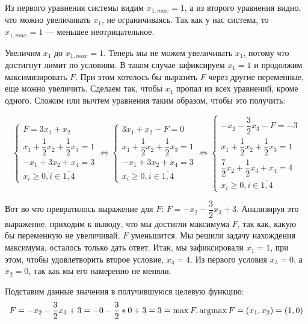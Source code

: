 Из первого уравнения системы видим $x_{1, max} = 1$, а из второго уравнения видно, что можно увеличивать $x_1$, не ограничиваясь.
Так как у нас система, то $x_{1, max} = 1$ --- меньшее неотрицательное.

Увеличим $x_1$ до $x_{1, max} = 1$. Теперь мы не можем увеличивать $x_1$, потому что достигнут лимит по условиям.
В таком случае зафиксируем $x_1 = 1$ и продолжим максимизировать $F$. При этом хотелось бы выразить $F$ через другие переменные,
еще можно увеличить. Сделаем так, чтобы $x_1$ пропал из всех уравнений, кроме одного. Сложим или вычтем уравнения таким образом, чтобы это получить:


\[
    \begin{cases}
        F = 3x_1 + x_2\\
        x_1 + \dfrac{1}{2}x_2 + \dfrac{1}{2}x_3 = 1\\ 
        -x_1 + 3x_2 + x_4 = 3\\
        x_{i} \geq 0, i\in\overline{1,4}
    \end{cases}
    \Leftrightarrow
    \begin{cases}
        3x_1 + x_2 - F = 0\\
        x_1 + \dfrac{1}{2}x_2 + \dfrac{1}{2}x_3 = 1\\
        -x_1 + 3x_2 + x_4 = 3\\
        x_{i} \geq 0, i\in\overline{1,4}
    \end{cases}
    \Leftrightarrow
    \begin{cases}
        -x_2 - \dfrac{3}{2}x_3 - F = -3\\
        x_1 + \dfrac{1}{2}x_2 + \dfrac{1}{2}x_3 = 1\\
        \dfrac{7}{2}x_2 + \dfrac{1}{2}x_3 + x_4 = 4\\
        x_{i} \geq 0, i\in\overline{1,4}
    \end{cases}
\]

Вот во что превратилось выражение для $F$: $F = -x_2 - \dfrac{3}{2}x_3 + 3$. Анализируя это выражение, приходим к выводу, что
мы достигли максимума $F$, так как, какую бы переменную не увеличивай, $F$ уменьшится. Мы решили задачу нахождения максимума, осталось только дать ответ.
Итак, мы зафиксировали $x_1 = 1$, при этом, чтобы удовлетворить второе условие, $x_4 = 4$. Из первого условия $x_3 = 0$, а $x_2 = 0$, так как мы его намеренно не меняли.

Подставим данные значения в получившуюся целевую функцию: 
$$F = -x_2 - \dfrac{3}{2}x_3 + 3 = -0 - \dfrac{3}{2} * 0 + 3 = 3 = \max F.\\ \operatorname*{argmax} F = (x_1, x_2) = (1, 0)$$

